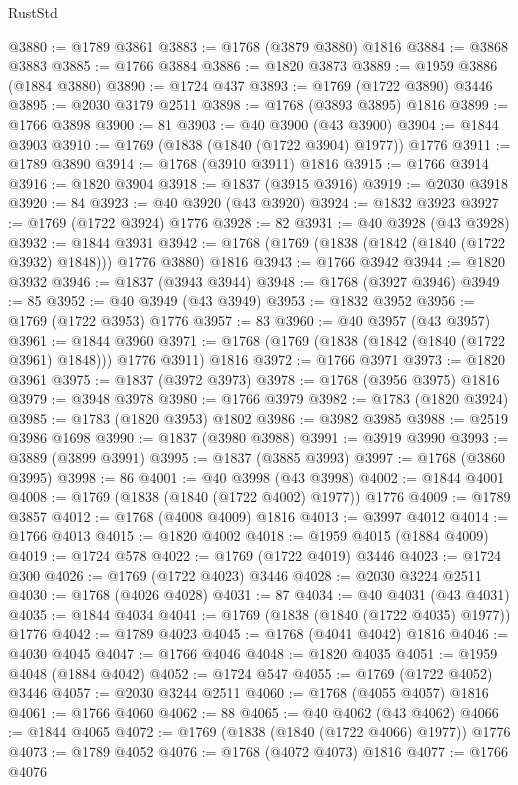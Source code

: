 \begin{lexlean}{RustStd}
\begin{coremodule}
@3880 := @1789 @3861
@3883 := @1768 (@3879 @3880) @1816
@3884 := @3868 @3883
@3885 := @1766 @3884
@3886 := @1820 @3873
@3889 := @1959 @3886 (@1884 @3880)
@3890 := @1724 @437
@3893 := @1769 (@1722 @3890) @3446
@3895 := @2030 @3179 @2511
@3898 := @1768 (@3893 @3895) @1816
@3899 := @1766 @3898
@3900 := 81
@3903 := @40 @3900 (@43 @3900)
@3904 := @1844 @3903
@3910 := @1769 (@1838 (@1840 (@1722 @3904) @1977)) @1776
@3911 := @1789 @3890
@3914 := @1768 (@3910 @3911) @1816
@3915 := @1766 @3914
@3916 := @1820 @3904
@3918 := @1837 (@3915 @3916)
@3919 := @2030 @3918
@3920 := 84
@3923 := @40 @3920 (@43 @3920)
@3924 := @1832 @3923
@3927 := @1769 (@1722 @3924) @1776
@3928 := 82
@3931 := @40 @3928 (@43 @3928)
@3932 := @1844 @3931
@3942 := @1768 (@1769 (@1838 (@1842 (@1840 (@1722 @3932) @1848))) @1776 @3880) @1816
@3943 := @1766 @3942
@3944 := @1820 @3932
@3946 := @1837 (@3943 @3944)
@3948 := @1768 (@3927 @3946)
@3949 := 85
@3952 := @40 @3949 (@43 @3949)
@3953 := @1832 @3952
@3956 := @1769 (@1722 @3953) @1776
@3957 := 83
@3960 := @40 @3957 (@43 @3957)
@3961 := @1844 @3960
@3971 := @1768 (@1769 (@1838 (@1842 (@1840 (@1722 @3961) @1848))) @1776 @3911) @1816
@3972 := @1766 @3971
@3973 := @1820 @3961
@3975 := @1837 (@3972 @3973)
@3978 := @1768 (@3956 @3975) @1816
@3979 := @3948 @3978
@3980 := @1766 @3979
@3982 := @1783 (@1820 @3924)
@3985 := @1783 (@1820 @3953) @1802
@3986 := @3982 @3985
@3988 := @2519 @3986 @1698
@3990 := @1837 (@3980 @3988)
@3991 := @3919 @3990
@3993 := @3889 (@3899 @3991)
@3995 := @1837 (@3885 @3993)
@3997 := @1768 (@3860 @3995)
@3998 := 86
@4001 := @40 @3998 (@43 @3998)
@4002 := @1844 @4001
@4008 := @1769 (@1838 (@1840 (@1722 @4002) @1977)) @1776
@4009 := @1789 @3857
@4012 := @1768 (@4008 @4009) @1816
@4013 := @3997 @4012
@4014 := @1766 @4013
@4015 := @1820 @4002
@4018 := @1959 @4015 (@1884 @4009)
@4019 := @1724 @578
@4022 := @1769 (@1722 @4019) @3446
@4023 := @1724 @300
@4026 := @1769 (@1722 @4023) @3446
@4028 := @2030 @3224 @2511
@4030 := @1768 (@4026 @4028)
@4031 := 87
@4034 := @40 @4031 (@43 @4031)
@4035 := @1844 @4034
@4041 := @1769 (@1838 (@1840 (@1722 @4035) @1977)) @1776
@4042 := @1789 @4023
@4045 := @1768 (@4041 @4042) @1816
@4046 := @4030 @4045
@4047 := @1766 @4046
@4048 := @1820 @4035
@4051 := @1959 @4048 (@1884 @4042)
@4052 := @1724 @547
@4055 := @1769 (@1722 @4052) @3446
@4057 := @2030 @3244 @2511
@4060 := @1768 (@4055 @4057) @1816
@4061 := @1766 @4060
@4062 := 88
@4065 := @40 @4062 (@43 @4062)
@4066 := @1844 @4065
@4072 := @1769 (@1838 (@1840 (@1722 @4066) @1977)) @1776
@4073 := @1789 @4052
@4076 := @1768 (@4072 @4073) @1816
@4077 := @1766 @4076

\end{coremodule}
\end{lexlean}
